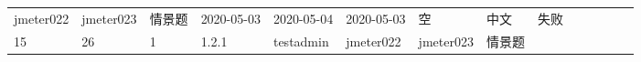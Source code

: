 \documentclass[hyperref, a4paper]{ctexart}
\begin{document}
\begin{longtable}[]{@{}llllllllllllll@{}}
\begin{minipage}[t]{0.04\columnwidth}
jmeter022\strut
\end{minipage} & \begin{minipage}[t]{0.04\columnwidth}\raggedright
jmeter023\strut
\end{minipage} & \begin{minipage}[t]{0.02\columnwidth}\raggedright
情景题\strut
\end{minipage} & \begin{minipage}[t]{0.04\columnwidth}\raggedright
2020-05-03\strut
\end{minipage} & \begin{minipage}[t]{0.05\columnwidth}\raggedright
2020-05-04\strut
\end{minipage} & \begin{minipage}[t]{0.07\columnwidth}\raggedright
2020-05-03\strut
\end{minipage} & \begin{minipage}[t]{0.08\columnwidth}\raggedright
空\strut
\end{minipage} & \begin{minipage}[t]{0.04\columnwidth}\raggedright
中文\strut
\end{minipage} & \begin{minipage}[t]{0.02\columnwidth}\raggedright
失败\strut
\end{minipage}\tabularnewline
\begin{minipage}[t]{0.01\columnwidth}\raggedright
15\strut
\end{minipage} & \begin{minipage}[t]{0.12\columnwidth}\raggedright
26\strut
\end{minipage} & \begin{minipage}[t]{0.03\columnwidth}\raggedright
1\strut
\end{minipage} & \begin{minipage}[t]{0.06\columnwidth}\raggedright
1.2.1\strut
\end{minipage} & \begin{minipage}[t]{0.04\columnwidth}\raggedright
testadmin\strut
\end{minipage} & \begin{minipage}[t]{0.04\columnwidth}\raggedright
jmeter022\strut
\end{minipage} & \begin{minipage}[t]{0.04\columnwidth}\raggedright
jmeter023\strut
\end{minipage} & \begin{minipage}[t]{0.02\columnwidth}\raggedright
情景题\strut
\end{minipage} & \begin{minipage}[t]{0.04\columnwidth}\raggedright

\end{minipage}
\end{longtable}
\end{document}
